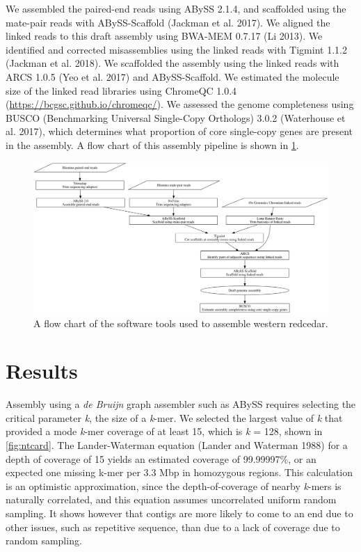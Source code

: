 \documentclass[
  12pt,
  oneside,
  openany]{book}
\begin{document}
We assembled the paired-end reads using ABySS 2.1.4, and scaffolded using the mate-pair reads with ABySS-Scaffold (Jackman et al. 2017). We aligned the linked reads to this draft assembly using BWA-MEM 0.7.17 (Li 2013). We identified and corrected misassemblies using the linked reads with Tigmint 1.1.2 (Jackman et al. 2018). We scaffolded the assembly using the linked reads with ARCS 1.0.5 (Yeo et al. 2017) and ABySS-Scaffold. We estimated the molecule size of the linked read libraries using ChromeQC 1.0.4 (\url{https://bcgsc.github.io/chromeqc/}). We assessed the genome completeness using BUSCO (Benchmarking Universal Single-Copy Orthologs) 3.0.2 (Waterhouse et al. 2017), which determines what proportion of core single-copy genes are present in the assembly. A flow chart of this assembly pipeline is shown in \cref{fig:redcedar_flowchart}.

\begin{figure}
\hypertarget{fig:redcedar_flowchart}{%
\centering
\includegraphics{redcedar/flowchart.png}
\caption[A flow chart of the software tools used to assemble western redcedar.]{A flow chart of the software tools used to assemble western redcedar.}\label{fig:redcedar_flowchart}
}
\end{figure}

\hypertarget{results-6}{%
\section{Results}\label{results-6}}

Assembly using a \emph{de Bruijn} graph assembler such as ABySS requires selecting the critical parameter \emph{k}, the size of a \emph{k}-mer. We selected the largest value of \emph{k} that provided a mode \emph{k}-mer coverage of at least 15, which is \emph{k} = 128, shown in \cref{fig:ntcard}. The Lander-Waterman equation (Lander and Waterman 1988) for a depth of coverage of 15 yields an estimated coverage of 99.99997\%, or an expected one missing k-mer per 3.3 Mbp in homozygous regions. This calculation is an optimistic approximation, since the depth-of-coverage of nearby \emph{k}-mers is naturally correlated, and this equation assumes uncorrelated uniform random sampling. It shows however that contigs are more likely to come to an end due to other issues, such as repetitive sequence, than due to a lack of coverage due to random sampling.
\end{document}
